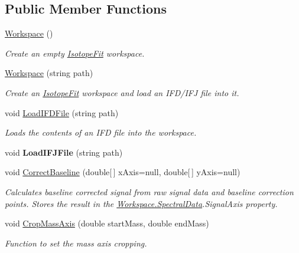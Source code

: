 \subsection*{Public Member Functions}
\begin{DoxyCompactItemize}
\item 
\hyperlink{class_isotope_fit_1_1_workspace_affa8b6ac937cee367c225c606782da17}{Workspace} ()
\begin{DoxyCompactList}\small\item\em Create an empty \hyperlink{namespace_isotope_fit}{Isotope\+Fit} workspace. \end{DoxyCompactList}\item 
\hyperlink{class_isotope_fit_1_1_workspace_a5aa1f6546513d331f262d383fe6b0358}{Workspace} (string path)
\begin{DoxyCompactList}\small\item\em Create an \hyperlink{namespace_isotope_fit}{Isotope\+Fit} workspace and load an I\+F\+D/\+I\+FJ file into it. \end{DoxyCompactList}\item 
void \hyperlink{class_isotope_fit_1_1_workspace_a55061c1f05d3e02d2d591fe6211d2f1f}{Load\+I\+F\+D\+File} (string path)
\begin{DoxyCompactList}\small\item\em Loads the contents of an I\+FD file into the workspace. \end{DoxyCompactList}\item 
\mbox{\label{class_isotope_fit_1_1_workspace_aba9a547d376319e836898f4878ce7aab}} 
void {\bfseries Load\+I\+F\+J\+File} (string path)
\item 
void \hyperlink{class_isotope_fit_1_1_workspace_aa0b81213937d49ae3a6183563cfe0f60}{Correct\+Baseline} (double\mbox{[}$\,$\mbox{]} x\+Axis=null, double\mbox{[}$\,$\mbox{]} y\+Axis=null)
\begin{DoxyCompactList}\small\item\em Calculates baseline corrected signal from raw signal data and baseline correction points. Stores the result in the \hyperlink{class_isotope_fit_1_1_workspace_a1d6cc2dd07cbfe920da9f1bffc9b32c2}{Workspace.\+Spectral\+Data}.Signal\+Axis property. \end{DoxyCompactList}\item 
void \hyperlink{class_isotope_fit_1_1_workspace_a9c1e21aff90947ff3414ac9d90472452}{Crop\+Mass\+Axis} (double start\+Mass, double end\+Mass)
\begin{DoxyCompactList}\small\item\em Function to set the mass axis cropping. \end{DoxyCompactList}\item 

\end{DoxyCompactItemize}
